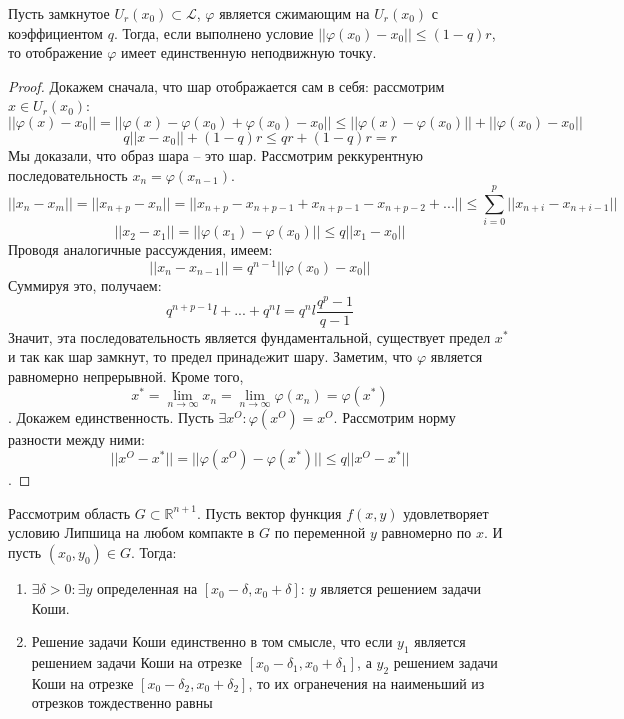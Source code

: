 \documentclass[document.tex]{subfiles}
\begin{document}
\begin{theorem}
	Пусть замкнутое $U_r(x_0) \subset \mathcal{L}$, $\varphi$ является сжимающим на $U_r(x_0)$ с коэффициентом $q$. Тогда, если выполнено условие
	$||\varphi(x_0) - x_0|| \leq (1 - q)r$, то отображение $\varphi$ имеет единственную неподвижную точку.
\end{theorem}

\begin{proof}
	Докажем сначала, что шар отображается сам в себя: рассмотрим $x \in U_r(x_0)$:
	$$||\varphi(x) - x_0|| = ||\varphi(x) - \varphi(x_0) + \varphi(x_0) - x_0|| \leq ||\varphi(x) - \varphi(x_0)|| + ||\varphi(x_0) - x_0||$$
	$$q||x - x_0|| + (1-q)r \leq qr + (1-q)r = r$$
	Мы доказали, что образ шара -- это шар. Рассмотрим реккурентную последовательность $x_n = \varphi(x_{n-1})$.
	$$||x_n - x_m|| = ||x_{n+p} - x_n|| = ||x_{n+p} - x_{n+p-1} + x_{n+p-1} - x_{n+p-2} + ...|| \leq \sum_{i = 0}^p ||x_{n+i} - x_{n+i-1}||$$
	$$||x_2 - x_1|| = ||\varphi(x_1) - \varphi(x_0)|| \leq q||x_1 - x_0||$$
	Проводя аналогичные рассуждения, имеем:
	$$||x_n - x_{n-1}|| = q^{n-1}||\varphi(x_0) - x_0||$$
	Суммируя это, получаем:
	$$q^{n+p-1} l + ... + q^n l = q^n l \frac{q^{p} - 1}{q-1}$$
	Значит, эта последовательность является фундаментальной, существует предел $x^*$ и так как шар замкнут, то предел принадeжит шару.
	Заметим, что $\varphi$ является равномерно непрерывной. Кроме того, 
	$$x^* = \lim_{n \rightarrow \infty} x_n = \lim_{n \rightarrow \infty} \varphi(x_n) = \varphi(x^*)$$.
	Докажем единственность. Пусть $\exists x^O : \varphi(x^O) = x^O$. Рассмотрим норму разности между ними:
	$$||x^O - x^*|| = ||\varphi(x^O) - \varphi(x^*)|| \leq q ||x^O - x^*||$$.
\end{proof}

\begin{theorem}
	Рассмотрим область $G \subset \mathbb{R}^{n+1}$. Пусть вектор функция $f(x, y)$ удовлетворяет условию Липшица на любом компакте в $G$ 
	по переменной $y$ равномерно по $x$. И пусть $(x_0, y_0) \in G$. Тогда:
	\begin{enumerate}
		\item $\exists \delta > 0 : \exists y$ определенная на $[x_0 - \delta, x_0 + \delta]$: $y$ является решением задачи Коши.
		\item Решение задачи Коши единственно в том смысле, что если $y_1$ является решением задачи Коши на отрезке $[x_0 - \delta_1,
		x_0 + \delta_1]$, а $y_2$ решением задачи Коши на отрезке $[x_0 - \delta_2, x_0 + \delta_2]$, то их огранечения на наименьший из
		отрезков тождественно равны
	\end{enumerate}
	
	
\end{theorem}
\end{document}
